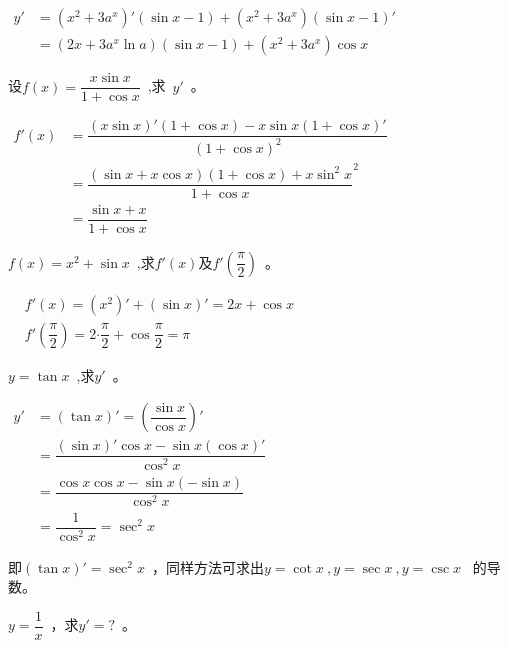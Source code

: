 \begin{solution}
$\begin{aligned}
y'&=\left(x^2+3a^x\right)'\left(\sin x-1\right)+\left(x^2+3a^x\right)\left(\sin x-1\right)'\\
&=\left(2x+3a^x\ln a\right)\left(\sin x-1\right)+\left(x^2+3a^x\right)\cos x
\end{aligned}$
\end{solution}
\begin{example}
设$f(x)=\dfrac{x\sin x}{1+\cos x}$~,求~$y'$~。
\end{example}
\begin{solution}
$\begin{aligned}
f'(x)&=\dfrac{\left(x\sin x\right)'\left(1+\cos x\right)-x\sin x\left(1+\cos x\right)'}{\left(1+\cos x\right)^2}\\
&=\dfrac{\left(\sin x+x\cos x\right)\left(1+\cos x\right)+x\sin ^2 x}{1+\cos x}^2\\
&=\dfrac{\sin x+x}{1+\cos x}
\end{aligned}$
\end{solution}
\begin{example}
$f(x)=x^2+\sin x$~,求$f'(x)\text{及}f'(\dfrac{\pi}{2})$~。
\end{example}
\begin{solution}
$\begin{aligned}
&f'(x)=\left(x^2\right)'+\left(\sin x\right)'=2x+\cos x\\
&f'\left(\dfrac{\pi}{2}\right)=2\bm\cdot \dfrac{\pi}{2}+\cos \dfrac{\pi}{2}=\pi
\end{aligned}$
\end{solution}
\begin{example}
$y=\tan x$~,求$y'$~。
\end{example}
\begin{solution}
$\begin{aligned}
y'&=\left(\tan x\right)'=\left(\dfrac{\sin x}{\cos x}\right)'\\
&=\dfrac{\left(\sin x\right)'\cos x-\sin x\left(\cos x\right)'}{\cos ^2 x}\\
&=\dfrac{\cos x\cos x-\sin x\left(-\sin x\right)}{\cos ^2 x}\\
&=\dfrac{1}{\cos^2 x}=\sec ^2 x
\end{aligned}$
\end{solution}
即$\left(\tan x\right)'=\sec ^2 x$~，同样方法可求出$y=\cot x~,y=\sec x~,y=\csc x$~
的导数。
\begin{example}
$y=\dfrac{1}{x}$~，求$y'=?$~。
\end{example}
